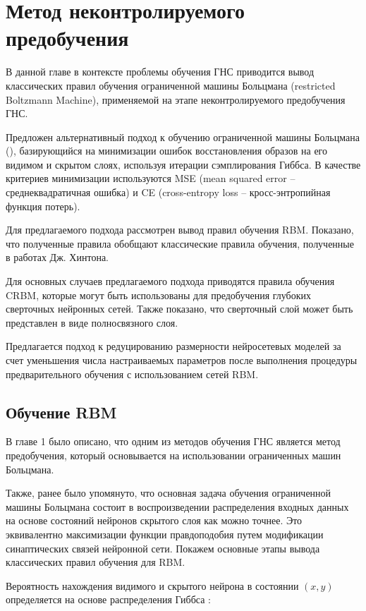 \chapter{Метод неконтролируемого предобучения}

В данной главе в контексте проблемы обучения ГНС приводится вывод классических правил обучения ограниченной машины Больцмана (restricted Boltzmann Machine), применяемой на этапе неконтролируемого предобучения ГНС.

Предложен альтернативный подход к обучению ограниченной машины Больцмана (\cite{1-A, 4-A, 5-A}), базирующийся на минимизации ошибок восстановления образов на его видимом и скрытом слоях, используя итерации сэмплирования Гиббса. В качестве критериев минимизации используются MSE (mean squared error -- среднеквадратичная ошибка) и CE (cross-entropy loss -- кросс-энтропийная функция потерь). 

Для предлагаемого подхода рассмотрен вывод правил обучения RBM. Показано, что полученные правила обобщают классические правила обучения, полученные в работах Дж. Хинтона.

Для основных случаев предлагаемого подхода приводятся правила обучения CRBM, которые могут быть использованы для предобучения глубоких сверточных нейронных сетей. Также показано, что сверточный слой может быть представлен в виде полносвязного слоя.

Предлагается подход к редуцированию размерности нейросетевых моделей за счет уменьшения числа настраиваемых параметров после выполнения процедуры предварительного обучения с использованием сетей RBM.

\section{Обучение RBM}
\label{sec:train_rbm_classic}

В главе 1 было описано, что одним из методов обучения ГНС является метод предобучения, который основывается на использовании ограниченных машин Больцмана.

Также, ранее было упомянуто, что основная задача обучения ограниченной машины Больцмана состоит в воспроизведении распределения входных данных на основе состояний нейронов скрытого слоя как можно точнее. Это эквивалентно  максимизации функции правдоподобия путем модификации синаптических связей нейронной сети. Покажем основные этапы вывода классических правил обучения для RBM.

Вероятность нахождения видимого и скрытого нейрона в состоянии $(x, y)$ определяется на основе распределения Гиббса \cite{gibbs1902}:
	
